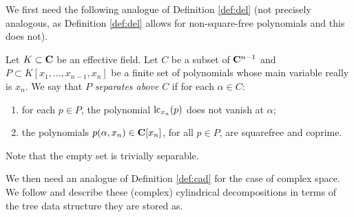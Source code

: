 \documentclass[runningheads,a4paper]{llncs}
\begin{document}
We first need the following analogue of Definition \ref{def:del} (not precisely analogous, as Definition \ref{def:del} allows for non-square-free polynomials and this does not).
\begin{definition}\label{def:sep}Let $K\subset{\mathbf C}$ be an effective field.
Let $C$ be a subset of ${\mathbf C}^{n-1}$ and $P \subset  K[x_1,\ldots,x_{n-1}, x_n]$ be a finite set of polynomials whose main variable really is $x_n$. We say that $P$ \emph{separates above} $C$ if for each $\alpha\in C$:
\begin{enumerate}
\item for each $p\in P$, the polynomial $\mathop{\rm lc}\nolimits_{x_n}(p)$ does not vanish at $\alpha$;
\item the polynomials $p(\alpha, x_n) \in {\mathbf C}[x_n]$, for all $p\in P$, are squarefree and coprime.
\end{enumerate}
Note that the empty set is trivially separable.
\end{definition}
\def\cD{{\cal D}}
We then need an analogue of Definition \ref{def:cad} for the case of complex space.  We follow \cite{ChenMorenoMaza2012a} and describe these (complex) cylindrical decompositions in terms of the tree data structure they are stored as.
\end{document}
